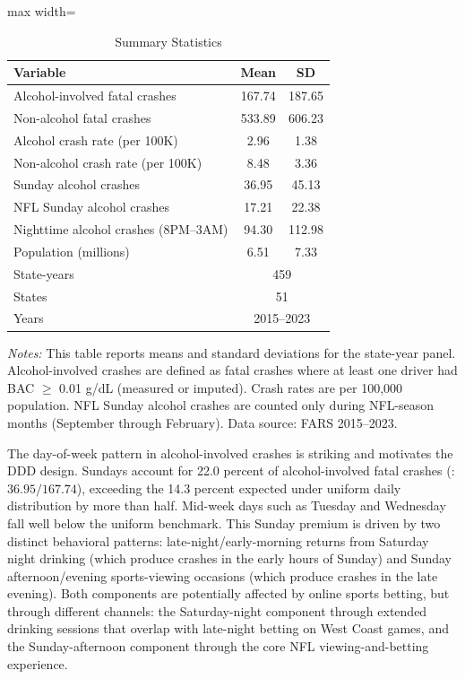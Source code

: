 \documentclass[12pt]{article}
\begin{document}
\begin{table}[H]
\centering
\caption{Summary Statistics}
\begin{threeparttable}
\begin{adjustbox}{max width=\textwidth}
\begin{tabular}{lcc}
\toprule
Variable & Mean & SD \\
\midrule
Alcohol-involved fatal crashes & 167.74 & 187.65 \\
Non-alcohol fatal crashes & 533.89 & 606.23 \\
Alcohol crash rate (per 100K) & 2.96 & 1.38 \\
Non-alcohol crash rate (per 100K) & 8.48 & 3.36 \\
Sunday alcohol crashes & 36.95 & 45.13 \\
NFL Sunday alcohol crashes & 17.21 & 22.38 \\
Nighttime alcohol crashes (8PM--3AM) & 94.30 & 112.98 \\
Population (millions) & 6.51 & 7.33 \\
\midrule
State-years & \multicolumn{2}{c}{459} \\
States & \multicolumn{2}{c}{51} \\
Years & \multicolumn{2}{c}{2015--2023} \\
\bottomrule
\end{tabular}
\end{adjustbox}
\begin{tablenotes}[flushleft]
\small
\item \emph{Notes:} This table reports means and standard deviations for the state-year panel. Alcohol-involved crashes are defined as fatal crashes where at least one driver had BAC $\geq$ 0.01 g/dL (measured or imputed). Crash rates are per 100,000 population. NFL Sunday alcohol crashes are counted only during NFL-season months (September through February). Data source: FARS 2015--2023.
\end{tablenotes}
\end{threeparttable}
\label{tab:sumstats}
\end{table}

The day-of-week pattern in alcohol-involved crashes is striking and motivates the DDD design. Sundays account for 22.0 percent of alcohol-involved fatal crashes (: $36.95 / 167.74$), exceeding the 14.3 percent expected under uniform daily distribution by more than half. Mid-week days such as Tuesday and Wednesday fall well below the uniform benchmark. This Sunday premium is driven by two distinct behavioral patterns: late-night/early-morning returns from Saturday night drinking (which produce crashes in the early hours of Sunday) and Sunday afternoon/evening sports-viewing occasions (which produce crashes in the late evening). Both components are potentially affected by online sports betting, but through different channels: the Saturday-night component through extended drinking sessions that overlap with late-night betting on West Coast games, and the Sunday-afternoon component through the core NFL viewing-and-betting experience.
\end{document}
